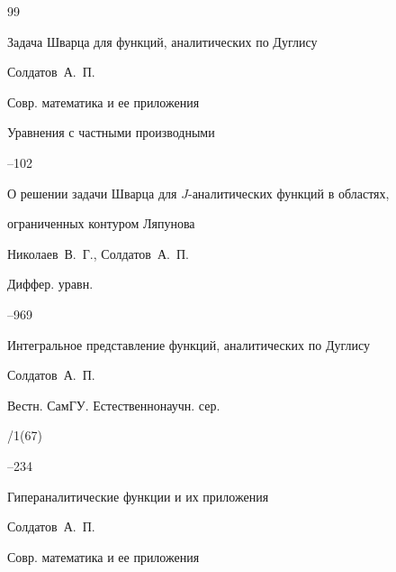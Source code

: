 \RusRef






\begin{thebibliography}{99}




\paper Задача Шварца для функций, аналитических по Дуглису

\by Солдатов~А.~П.

\jour Совр. математика и ее приложения



\volinfo Уравнения с частными производными

--102





\paper О  решении задачи Шварца для $J$-аналитических функций в областях,

ограниченных контуром Ляпунова

\by   Николаев~В.~Г., Солдатов~А.~П.

\jour Диффер.  уравн.



--969





\paper Интегральное представление функций, аналитических по Дуглису

\by Солдатов~А.~П.

\jour Вестн. СамГУ. Естественнонаучн. сер.


/1(67)

--234










\paper Гипераналитические функции и их приложения

\by Солдатов~А.~П.

\jour Совр. математика и ее приложения


\end{thebibliography}

